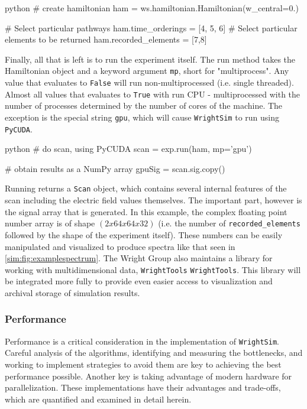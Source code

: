 \begin{codefragment}{python}
# create hamiltonian
ham = ws.hamiltonian.Hamiltonian(w_central=0.)

# Select particular pathways
ham.time_orderings = [4, 5, 6]
# Select particular elements to be returned
ham.recorded_elements = [7,8]
\end{codefragment}

Finally, all that is left is to run the experiment itself. The run
method takes the Hamiltonian object and a keyword argument \texttt{mp},
short for "multiprocess". Any value that evaluates to \texttt{False}
will run non-multiprocessed (i.e. single threaded). Almost all values
that evaluates to \texttt{True} with run CPU - multiprocessed with the
number of processes determined by the number of cores of the machine.
The exception is the special string
\texttt{\textquotesingle{}gpu\textquotesingle{}}, which will cause
\texttt{WrightSim} to run using \texttt{PyCUDA}.

\begin{codefragment}{python}
# do scan, using PyCUDA
scan = exp.run(ham, mp='gpu')

# obtain results as a NumPy array
gpuSig = scan.sig.copy()
\end{codefragment}


Running returns a \texttt{Scan} object, which contains several internal
features of the scan including the electric field values themselves. The
important part, however is the signal array that is generated. In this
example, the complex floating point number array is of shape
\((2x64x64x32)\) (i.e. the number of \texttt{recorded\_elements}
followed by the shape of the experiment itself). These numbers can be
easily manipulated and visualized to produce spectra like that seen in
\ref{sim:fig:examplespectrum}. The Wright Group also maintains a library
for working with multidimensional data, \texttt{WrightTools}
\texttt{WrightTools}. This library will be integrated more fully to
provide even easier access to visualization and archival storage of
simulation results.

\hypertarget{performance}{%
\subsubsection{Performance}\label{performance}}

Performance is a critical consideration in the implementation of
\texttt{WrightSim}. Careful analysis of the algorithms, identifying and
measuring the bottlenecks, and working to implement strategies to avoid
them are key to achieving the best performance possible. Another key is
taking advantage of modern hardware for parallelization. These
implementations have their advantages and trade-offs, which are
quantified and examined in detail herein.

